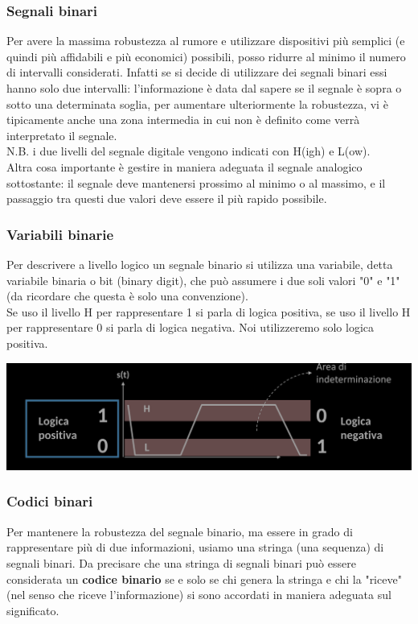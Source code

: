 \documentclass{article}
\begin{document}
\subsubsection{Segnali binari}
Per avere la massima robustezza al rumore e utilizzare dispositivi più semplici (e quindi più affidabili e più economici) possibili, posso ridurre al minimo il numero di intervalli considerati. Infatti se si decide di utilizzare dei segnali binari essi hanno solo due intervalli: l’informazione è data dal sapere se il segnale è sopra o sotto una determinata soglia, per aumentare ulteriormente la robustezza, vi è tipicamente anche una zona intermedia in cui non è definito come verrà interpretato il segnale.
\vspace{0.2cm}\\
N.B. i due livelli del segnale digitale vengono indicati con H(igh) e L(ow).
\vspace{0.2cm}\\
Altra cosa importante è gestire in maniera adeguata il segnale analogico sottostante: il segnale deve mantenersi prossimo al minimo o al massimo, e il passaggio tra questi due valori deve essere il più rapido possibile.
\subsubsection*{Variabili binarie}
Per descrivere a livello logico un segnale binario si utilizza una variabile, detta variabile binaria o bit (binary digit), che può assumere i due soli valori "0" e "1" (da ricordare che questa è solo una convenzione).
\vspace{0.2cm}\\
Se uso il livello H per rappresentare 1 si parla di logica positiva, se uso il livello H per rappresentare 0 si parla di logica negativa. Noi utilizzeremo solo logica positiva.
\begin{center}
    \includegraphics[scale=0.3]{logica.png}
\end{center}
\subsubsection*{Codici binari}
Per mantenere la robustezza del segnale binario, ma essere in grado di rappresentare più di due informazioni, usiamo una stringa (una sequenza) di segnali binari. Da precisare che una stringa di segnali binari può essere considerata un \textbf{codice binario} se e solo se chi genera la stringa e chi la "riceve" (nel senso che riceve l'informazione) si sono accordati in maniera adeguata sul significato.
\end{document}
